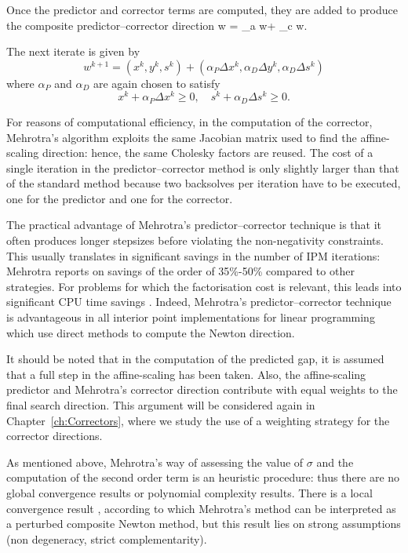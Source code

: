 Once the predictor and corrector terms are computed, they are 
added to produce the composite predictor--corrector direction
\be \label{eq:CompositeDirection}
\Delta w = \Delta_a w+ \Delta_c w.
\ee

The next iterate is given by
\[
w^{k+1} = (x^k,y^k,s^k)
        + (\alpha_P\Delta x^k,\alpha_D\Delta y^k,\alpha_D\Delta s^k)
\]
where $\alpha_P$ and $\alpha_D$ are again chosen to satisfy
\[
x^k+\alpha_P\Delta x^k \ge 0, \quad s^k+\alpha_D\Delta s^k \ge 0.
\]

For reasons of computational efficiency, in the computation of
the corrector, Mehrotra's algorithm exploits 
the same Jacobian matrix used to find the affine-scaling direction: 
hence, the same Cholesky factors are reused.
The cost of a single iteration in the predictor--corrector 
method is only slightly larger than that of the standard 
method because two backsolves per iteration have to be executed, 
one for the predictor and one for the corrector. 

The practical advantage of Mehrotra's predictor--corrector technique
is that it often produces longer stepsizes before violating the 
non-negativity constraints.
%
This usually translates in significant savings in the number of IPM 
iterations: Mehrotra \cite{Mehrotra92} reports on savings of the
order of 35\%-50\% compared to other strategies.
For problems for which the factorisation cost is relevant, this
leads into significant 
CPU time savings \cite{LustigMarstenShanno,Mehrotra92}. Indeed, 
Mehrotra's predictor--corrector technique is advantageous in all 
interior point implementations for linear programming 
which use direct methods to compute 
the Newton direction.

It should be noted that in the computation of the predicted gap, 
it is assumed that a full step in the affine-scaling has been taken. 
Also, the affine-scaling predictor and Mehrotra's corrector direction 
contribute with equal weights to the final search direction. 
This argument will be considered again in Chapter~\ref{ch:Correctors}, 
where we study the use of a weighting strategy for the corrector
directions.

As mentioned above, Mehrotra's way of assessing the value of $\sigma$
and the computation of the second order term is an heuristic procedure: 
thus there are 
no global convergence results or polynomial complexity results. 
There is a local convergence result \cite{TapiaZhangSaltzmanWeiser}, 
according to which Mehrotra's method can be interpreted as a 
perturbed composite Newton method, but this result lies on strong 
assumptions (non degeneracy, strict complementarity).

